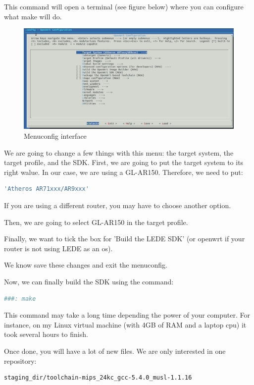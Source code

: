 This command will open a terminal (see figure below) where you can configure what make will do.

\begin{figure}[H]
\includegraphics[width=\columnwidth]{image/menuconfig1.jpg}%
\caption{Menuconfig interface}%
\label{figure:menuconfig1}%
\end{figure}

We are going to change a few things with this menu: the target system, the target profile, and the SDK.
First, we are going to put the target system to its right walue. In our case, we are using a GL-AR150. Therefore, we need to put:
\begin{lstlisting}[language=bash]
  'Atheros AR71xxx/AR9xxx'
\end{lstlisting}

If you are using a different router, you may have to choose another option.

Then, we are going to select GL-AR150 in the target profile.

Finally, we want to tick the box for 'Build the LEDE SDK' (or openwrt if your router is not using LEDE as an os).

We know save these changes and exit the menuconfig.

Now, we can finally build the SDK using the command:
\begin{lstlisting}[language=bash]
	###: make
\end{lstlisting}

This command may take a long time depending the power of your computer. For instance, on my Linux virtual machine (with 4GB of RAM and a laptop cpu) it took several hours to finish.

Once done, you will have a lot of new files. We are only interested in one repository:
\begin{lstlisting}[language=bash]
	staging_dir/toolchain-mips_24kc_gcc-5.4.0_musl-1.1.16
\end{lstlisting}

